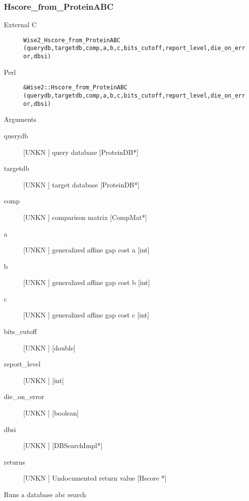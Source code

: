 \subsubsection{Hscore_from_ProteinABC}
\begin{description}
\item[External C] {\tt Wise2_Hscore_from_ProteinABC (querydb,targetdb,comp,a,b,c,bits_cutoff,report_level,die_on_error,dbsi)}
\item[Perl] {\tt &Wise2::Hscore_from_ProteinABC (querydb,targetdb,comp,a,b,c,bits_cutoff,report_level,die_on_error,dbsi)}

\end{description}
Arguments
\begin{description}
\item[querydb] [UNKN ] query database  [ProteinDB*]
\item[targetdb] [UNKN ] target database [ProteinDB*]
\item[comp] [UNKN ] comparison matrix [CompMat*]
\item[a] [UNKN ] generalized affine gap cost a [int]
\item[b] [UNKN ] generalized affine gap cost b [int]
\item[c] [UNKN ] generalized affine gap cost c [int]
\item[bits_cutoff] [UNKN ]  [double]
\item[report_level] [UNKN ]  [int]
\item[die_on_error] [UNKN ]  [boolean]
\item[dbsi] [UNKN ]  [DBSearchImpl*]
\item[returns] [UNKN ] Undocumented return value [Hscore *]
\end{description}
Runs a database abc search 


